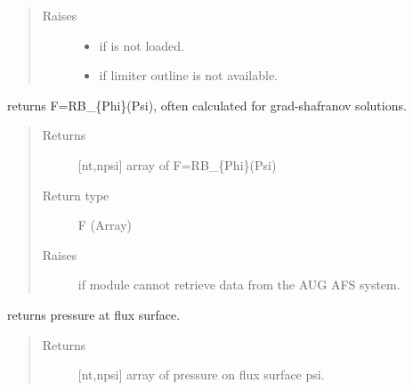\documentclass[letterpaper,10pt,english]{sphinxmanual}
\begin{document}
\begin{fulllineitems}
\begin{fulllineitems}
\begin{quote}
\begin{description}
\item[{Raises}] \leavevmode\begin{itemize}
\item {} 
 \textendash{} if  is not loaded.

\item {} 
 \textendash{} if limiter outline is not available.

\end{itemize}

\end{description}\end{quote}

\end{fulllineitems}


\begin{fulllineitems}
\label{\detokenize{eqtools:eqtools.AUGData.AUGDDData.getF}}
returns F=RB\_\{Phi\}(Psi), often calculated for grad-shafranov
solutions.
\begin{quote}\begin{description}
\item[{Returns}] \leavevmode
{[}nt,npsi{]} array of F=RB\_\{Phi\}(Psi)

\item[{Return type}] \leavevmode
F (Array)

\item[{Raises}] \leavevmode
{} \textendash{} if module cannot retrieve data from the AUG AFS system.

\end{description}\end{quote}

\end{fulllineitems}


\begin{fulllineitems}
\label{\detokenize{eqtools:eqtools.AUGData.AUGDDData.getFluxPres}}
returns pressure at flux surface.
\begin{quote}\begin{description}
\item[{Returns}] \leavevmode
{[}nt,npsi{]} array of pressure on flux surface psi.


\end{description}
\end{quote}
\end{fulllineitems}
\end{fulllineitems}
\end{document}
